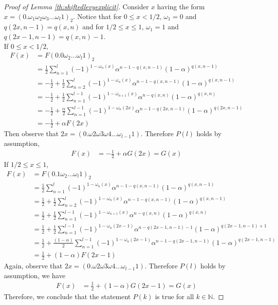 \documentclass[10pt,a4paper]{amsart}
\begin{document}
\begin{proof}[Proof of Lemma \ref{th:shiftedlevyexplicit}]
Consider $x$ having the form $x=(0.\omega_1\omega_2\omega_3 \dots \omega_{l}1)_2$.
Notice that for $0\leq x<1/2$, $\omega_1=0$ and $q(2x,n-1) = q(x,n)$ and for $1/2 \leq x \leq 1$, $\omega_1=1$ and $q(2x-1,n-1) = q(x,n)-1$.\\
If $0\leq x< 1/2$,
\begin{align*}
    F(x) &= F(0.0 \omega_2\dots\omega_l1)_2\\
    &= \frac{1}{2}\sum_{n=1}^l(-1)^{1-\omega_n(x)}\alpha^{n-1-q(x,n-1)}(1-\alpha)^{q(x,n-1)}\\
    &=-\frac{1}{2}+\frac{1}{2}\sum_{n=2}^l(-1)^{1-\omega_n(x)}\alpha^{n-1-q(x,n-1)}(1-\alpha)^{q(x,n-1)}\\
    &=-\frac{1}{2}+\frac{1}{2}\sum_{n=1}^{l-1}(-1)^{1-\omega_{n+1}(x)}\alpha^{n-q(x,n)}(1-\alpha)^{q(x,n)}\\
    &=-\frac{1}{2}+\frac{\alpha}{2}\sum_{n=1}^{l-1}(-1)^{1-\omega_{n}(2x)}\alpha^{n-1-q(2x,n-1)}(1-\alpha)^{q(2x,n-1)}\\
    &= -\frac{1}{2}+\alpha F(2x)
\end{align*}
Then observe that $2x = (0.\omega2\omega3\omega4\dots\omega_{l-1}1)$.
Therefore $P(l)$ holds by assumption,
\begin{align*}
   F(x) &= -\frac{1}{2}+\alpha G(2x)= G(x)
\end{align*}
If $1/2 \leq x\leq1$,
\begin{align*}
    F(x) &= F(0.1 \omega_2\dots\omega_l1)_2\\
    &= \frac{1}{2}\sum_{n=1}^l(-1)^{1-\omega_n(x)}\alpha^{n-1-q(x,n-1)}(1-\alpha)^{q(x,n-1)}\\
    &=\frac{1}{2}+\frac{1}{2}\sum_{n=2}^l(-1)^{1-\omega_n(x)}\alpha^{n-1-q(x,n-1)}(1-\alpha)^{q(x,n-1)}\\
    &=\frac{1}{2}+\frac{1}{2}\sum_{n=1}^{l-1}(-1)^{1-\omega_{n+1}(x)}\alpha^{n-q(x,n)}(1-\alpha)^{q(x,n)}\\
    &=\frac{1}{2} +\frac{1}{2}\sum_{n=1}^{l-1}(-1)^{1-{\omega_n(2x-1)}}\alpha^{n-q(2x-1,n-1)-1}(1-\alpha)^{q(2x-1,n-1)+1}\\
    &=\frac{1}{2}+\frac{(1-\alpha)}{2}\sum_{n=1}^{l-1}(-1)^{1-\omega_n(2x-1)}\alpha^{n-1-q(2x-1,n-1)}(1-\alpha)^{q(2x-1,n-1)}\\
    &=\frac{1}{2}+(1-\alpha)F(2x-1)
\end{align*}
Again, observe that $2x = (0.\omega2\omega3\omega4\dots\omega_{l-1}1)$.
Therefore $P(l)$ holds by assumption, we have 
\begin{align*}
   F(x) &= \frac{1}{2}+(1-\alpha) G(2x-1)= G(x)
\end{align*}
Therefore, we conclude that the statement $P(k)$ is true for all $k \in \mathbb{N}$.
\end {proof}
\end{document}
